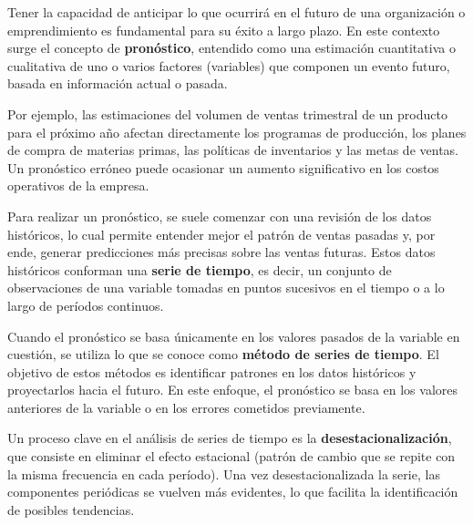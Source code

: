 Tener la capacidad de anticipar lo que ocurrirá en el futuro de una organización
o emprendimiento es fundamental para su éxito a largo plazo. En este contexto
surge el concepto de \textbf{pronóstico}, entendido como una estimación
cuantitativa o cualitativa de uno o varios factores (variables) que componen un
evento futuro, basada en información actual o pasada.

Por ejemplo, las estimaciones del volumen de ventas trimestral de un producto
para el próximo año afectan directamente los programas de producción, los planes
de compra de materias primas, las políticas de inventarios y las metas de
ventas. Un pronóstico erróneo puede ocasionar un aumento significativo en los
costos operativos de la empresa.

Para realizar un pronóstico, se suele comenzar con una revisión de los datos
históricos, lo cual permite entender mejor el patrón de ventas pasadas y, por
ende, generar predicciones más precisas sobre las ventas futuras. Estos datos
históricos conforman una \textbf{serie de tiempo}, es decir, un conjunto de
observaciones de una variable tomadas en puntos sucesivos en el tiempo o a lo
largo de períodos continuos.

Cuando el pronóstico se basa únicamente en los valores pasados de la variable en
cuestión, se utiliza lo que se conoce como \textbf{método de series de tiempo}.
El objetivo de estos métodos es identificar patrones en los datos históricos
y proyectarlos hacia el futuro. En este enfoque, el pronóstico se basa en los
valores anteriores de la variable o en los errores cometidos previamente.

Un proceso clave en el análisis de series de tiempo es la
\textbf{desestacionalización}, que consiste en eliminar el efecto estacional
(patrón de cambio que se repite con la misma frecuencia en cada período). Una
vez desestacionalizada la serie, las componentes periódicas se vuelven más
evidentes, lo que facilita la identificación de posibles tendencias.
